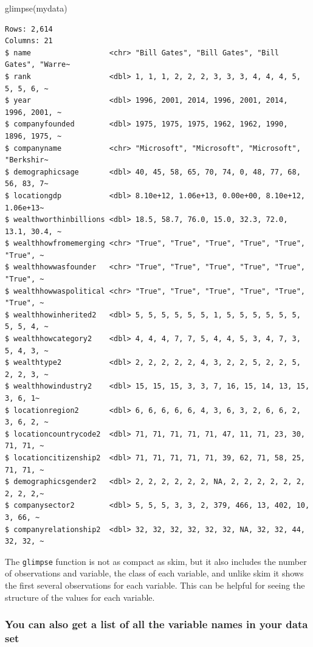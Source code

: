 \documentclass[
]{book}
\newenvironment{Shaded}{\begin{snugshade}}{\end{snugshade}}
\newcommand{\FunctionTok}[1]{\textcolor[rgb]{0.00,0.00,0.00}{#1}}
\newcommand{\NormalTok}[1]{#1}
\begin{document}
\begin{Shaded}
\begin{Highlighting}[]
\FunctionTok{glimpse}\NormalTok{(mydata)}
\end{Highlighting}
\end{Shaded}

\begin{verbatim}
Rows: 2,614
Columns: 21
$ name                  <chr> "Bill Gates", "Bill Gates", "Bill Gates", "Warre~
$ rank                  <dbl> 1, 1, 1, 2, 2, 2, 3, 3, 3, 4, 4, 4, 5, 5, 5, 6, ~
$ year                  <dbl> 1996, 2001, 2014, 1996, 2001, 2014, 1996, 2001, ~
$ companyfounded        <dbl> 1975, 1975, 1975, 1962, 1962, 1990, 1896, 1975, ~
$ companyname           <chr> "Microsoft", "Microsoft", "Microsoft", "Berkshir~
$ demographicsage       <dbl> 40, 45, 58, 65, 70, 74, 0, 48, 77, 68, 56, 83, 7~
$ locationgdp           <dbl> 8.10e+12, 1.06e+13, 0.00e+00, 8.10e+12, 1.06e+13~
$ wealthworthinbillions <dbl> 18.5, 58.7, 76.0, 15.0, 32.3, 72.0, 13.1, 30.4, ~
$ wealthhowfromemerging <chr> "True", "True", "True", "True", "True", "True", ~
$ wealthhowwasfounder   <chr> "True", "True", "True", "True", "True", "True", ~
$ wealthhowwaspolitical <chr> "True", "True", "True", "True", "True", "True", ~
$ wealthhowinherited2   <dbl> 5, 5, 5, 5, 5, 5, 1, 5, 5, 5, 5, 5, 5, 5, 5, 4, ~
$ wealthhowcategory2    <dbl> 4, 4, 4, 7, 7, 5, 4, 4, 5, 3, 4, 7, 3, 5, 4, 3, ~
$ wealthtype2           <dbl> 2, 2, 2, 2, 2, 4, 3, 2, 2, 5, 2, 2, 5, 2, 2, 3, ~
$ wealthhowindustry2    <dbl> 15, 15, 15, 3, 3, 7, 16, 15, 14, 13, 15, 3, 6, 1~
$ locationregion2       <dbl> 6, 6, 6, 6, 6, 4, 3, 6, 3, 2, 6, 6, 2, 3, 6, 2, ~
$ locationcountrycode2  <dbl> 71, 71, 71, 71, 71, 47, 11, 71, 23, 30, 71, 71, ~
$ locationcitizenship2  <dbl> 71, 71, 71, 71, 71, 39, 62, 71, 58, 25, 71, 71, ~
$ demographicsgender2   <dbl> 2, 2, 2, 2, 2, 2, NA, 2, 2, 2, 2, 2, 2, 2, 2, 2,~
$ companysector2        <dbl> 5, 5, 5, 3, 3, 2, 379, 466, 13, 402, 10, 3, 66, ~
$ companyrelationship2  <dbl> 32, 32, 32, 32, 32, 32, NA, 32, 32, 44, 32, 32, ~
\end{verbatim}

The \texttt{glimpse} function is not as compact as skim, but it also includes the number of observations and variable, the class of each variable, and unlike skim it shows the first several observations for each variable. This can be helpful for seeing the structure of the values for each variable.

\hypertarget{names}{%
\subsubsection*{You can also get a list of all the variable names in your data set}\label{names}}
\end{document}
